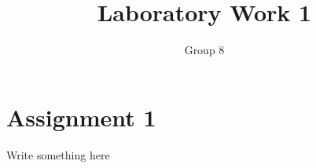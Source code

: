 \documentclass[11pt]{article}
\begin{document}
\author{Group 8}
\title{Laboratory Work 1}
\maketitle

\section{Assignment 1}
Write something here

\end{document}
